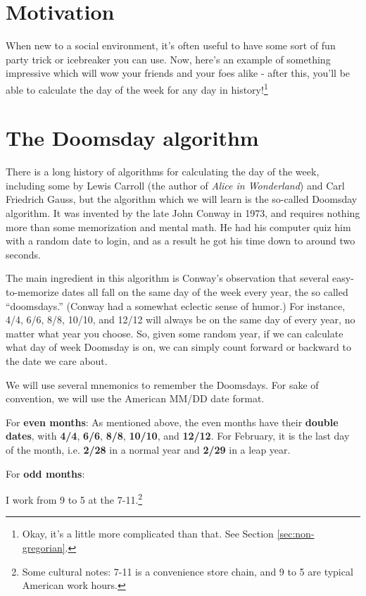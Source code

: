 \documentclass[12pt,letterpaper]{article}
\theoremstyle{plain}
\theoremstyle{definition}
\begin{document}
\section{Motivation}

When new to a social environment, it's often useful to have some sort of fun party trick or icebreaker you can use. Now, here's an example of something impressive which will wow your friends and your foes alike - after this, you'll be able to calculate the day of the week for any day in history!\footnote{Okay, it's a little more complicated than that. See Section \ref{sec:non-gregorian}.}

\section{The Doomsday algorithm}\label{sec:leapyear}

There is a long history of algorithms for calculating the day of the week, including some by Lewis Carroll (the author of \textit{Alice in Wonderland}) and Carl Friedrich Gauss, but the algorithm which we will learn is the so-called Doomsday algorithm. It was invented by the late John Conway in 1973, and requires nothing more than some memorization and mental math. He had his computer quiz him with a random date to login, and as a result he got his time down to around two seconds. 

The main ingredient in this algorithm is Conway's observation that several easy-to-memorize dates all fall on the same day of the week every year, the so called ``doomsdays.'' (Conway had a somewhat eclectic sense of humor.) For instance, 4/4, 6/6, 8/8, 10/10, and 12/12 will always be on the same day of every year, no matter what year you choose. So, given some random year, if we can calculate what day of week Doomsday is on, we can simply count forward or backward to the date we care about. 

We will use several mnemonics to remember the Doomsdays. For sake of convention, we will use the American MM/DD date format. 

For \textbf{even months}: As mentioned above, the even months have their \textbf{double dates}, with \textbf{4/4}, \textbf{6/6}, \textbf{8/8}, \textbf{10/10}, and \textbf{12/12}. For February, it is the last day of the month, i.e. \textbf{2/28} in a normal year and \textbf{2/29} in a leap year. 

For \textbf{odd months}: 

\begin{displayquote}
	I work from 9 to 5 at the 7-11.\footnote{Some cultural notes: 7-11 is a convenience store chain, and 9 to 5 are typical American work hours.} 
\end{displayquote}
\end{document}
